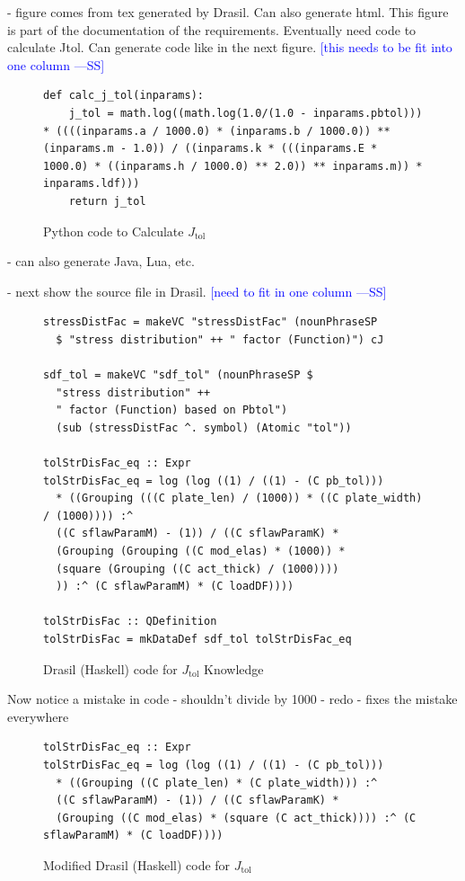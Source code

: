 \documentclass[sigconf]{acmart}
\newcommand{\authornt}[3]{\textcolor{#1}{[#3 ---#2]}}
\newcommand{\authornt}[3]{}
\newcommand{\wss}[1]{\authornt{blue}{SS}{#1}} %
\begin{document}
- figure comes from tex generated by Drasil.  Can also generate html.  This
figure is part of the documentation of the requirements.  Eventually need code
to calculate Jtol.  Can generate code like in the next figure. \wss{this needs
  to be fit into one column}

\begin{figure}[htpb]
\begin{lstlisting} 
def calc_j_tol(inparams):
    j_tol = math.log((math.log(1.0/(1.0 - inparams.pbtol))) 
* ((((inparams.a / 1000.0) * (inparams.b / 1000.0)) ** (inparams.m - 1.0)) / ((inparams.k * (((inparams.E * 1000.0) * ((inparams.h / 1000.0) ** 2.0)) ** inparams.m)) * inparams.ldf)))
    return j_tol
\end{lstlisting}
\caption{Python code to Calculate $J_{\mbox{tol}}$}
\label{Fig_JtolPython}
\end{figure}

- can also generate Java, Lua, etc.

- next show the source file in Drasil.  \wss{need to fit in one column}

\begin{figure}[htpb]
\begin{lstlisting} 
stressDistFac = makeVC "stressDistFac" (nounPhraseSP 
  $ "stress distribution" ++ " factor (Function)") cJ

sdf_tol = makeVC "sdf_tol" (nounPhraseSP $ 
  "stress distribution" ++
  " factor (Function) based on Pbtol") 
  (sub (stressDistFac ^. symbol) (Atomic "tol"))

tolStrDisFac_eq :: Expr
tolStrDisFac_eq = log (log ((1) / ((1) - (C pb_tol)))
  * ((Grouping (((C plate_len) / (1000)) * ((C plate_width) / (1000)))) :^
  ((C sflawParamM) - (1)) / ((C sflawParamK) *
  (Grouping (Grouping ((C mod_elas) * (1000)) *
  (square (Grouping ((C act_thick) / (1000))))
  )) :^ (C sflawParamM) * (C loadDF))))

tolStrDisFac :: QDefinition
tolStrDisFac = mkDataDef sdf_tol tolStrDisFac_eq
\end{lstlisting}
\caption{Drasil (Haskell) code for $J_{\mbox{tol}}$ Knowledge}
\label{Fig_JtolDrasil}
\end{figure}

Now notice a mistake in code - shouldn't divide by 1000 - redo - fixes the
mistake everywhere

\begin{figure}[htpb]
\begin{lstlisting} 
tolStrDisFac_eq :: Expr
tolStrDisFac_eq = log (log ((1) / ((1) - (C pb_tol)))
  * ((Grouping ((C plate_len) * (C plate_width))) :^
  ((C sflawParamM) - (1)) / ((C sflawParamK) *
  (Grouping ((C mod_elas) * (square (C act_thick)))) :^ (C sflawParamM) * (C loadDF))))
\end{lstlisting}
\caption{Modified Drasil (Haskell) code for $J_{\mbox{tol}}$}
\label{Fig_JtolDrasil_fix}
\end{figure}
\end{document}
